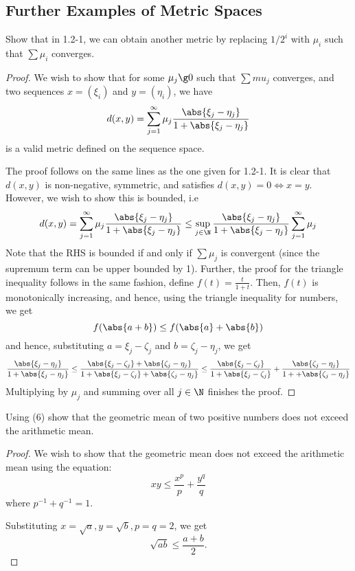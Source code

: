 \subsection{Further Examples of Metric Spaces}

\begin{question}
    Show that in 1.2-1, we can obtain another metric by replacing $1/2^i$ with $\mu_i$ such that $\sum \mu_i$ converges.
    \label{section1.2-1}
\end{question}
\begin{proof}
    We wish to show that for some $\mu_j \g 0$ such that $\sum mu_j$ converges, and two sequences $x = (\xi_i)$ and $y = (\eta_i)$, we have
    \[d(x,y) = \sum_{j=1}^\infty \mu_j \frac{\abs{\xi_j - \eta_j}}{1 + \abs{\xi_j - \eta_j}}  \]
    is a valid metric defined on the sequence space.

    The proof follows on the same lines as the one given for 1.2-1. It is clear that $d(x,y)$ is non-negative, symmetric, and satisfies $d(x,y) = 0 \iff x = y$. However, we wish to show this is bounded, i.e
    \[d(x,y) = \sum_{j=1}^\infty \mu_j \frac{\abs{\xi_j - \eta_j}}{1 + \abs{\xi_j - \eta_j}} \leq \sup_{j \in \N} \frac{\abs{\xi_j - \eta_j}}{1 + \abs{\xi_j - \eta_j}} \sum_{j=1}^\infty \mu_j\]
    Note that the RHS is bounded if and only if $\sum \mu_j$ is convergent (since the supremum term can be upper bounded by 1). Further, the proof for the triangle inequality follows in the same fashion, define $f(t) = \frac{t}{1 + t}$. Then, $f(t)$ is monotonically increasing, and hence, using the triangle inequality for numbers, we get
    \[f(\abs{a+b}) \leq f(\abs{a} + \abs{b})\]
    and hence, substituting $a = \xi_j - \zeta_j$ and $b = \zeta_j - \eta_j$, we get
    \[\frac{\abs{\xi_j - \eta_j}}{1 + \abs{\xi_j - \eta_j}} \leq \frac{\abs{\xi_j - \zeta_j} + \abs{\zeta_j - \eta_j}}{1 + \abs{\xi_j - \zeta_j} + \abs{\zeta_j - \eta_j}} \leq \frac{\abs{\xi_j - \zeta_j}}{1 + \abs{\xi_j - \zeta_j}} + \frac{\abs{\zeta_j - \eta_j}}{1 +  + \abs{\zeta_j - \eta_j}}\]
    Multiplying by $\mu_j$ and summing over all $j \in \N$ finishes the proof.
\end{proof}

\begin{question}
    Using (6) show that the geometric mean of two positive numbers does not exceed the arithmetic mean.
    \label{section1.2-2}
\end{question}
\begin{proof}
    We wish to show that the geometric mean does not exceed the arithmetic mean using the equation:
    \[xy \leq \frac{x^p}{p} + \frac{y^q}{q}\]
    where $p^{-1} + q^{-1} = 1$.
    
    Substituting $x = \sqrt{a} , y = \sqrt{b} , p = q = 2$, we get
    \[\sqrt{ab} \leq \frac{a + b}{2}.\]
\end{proof}

